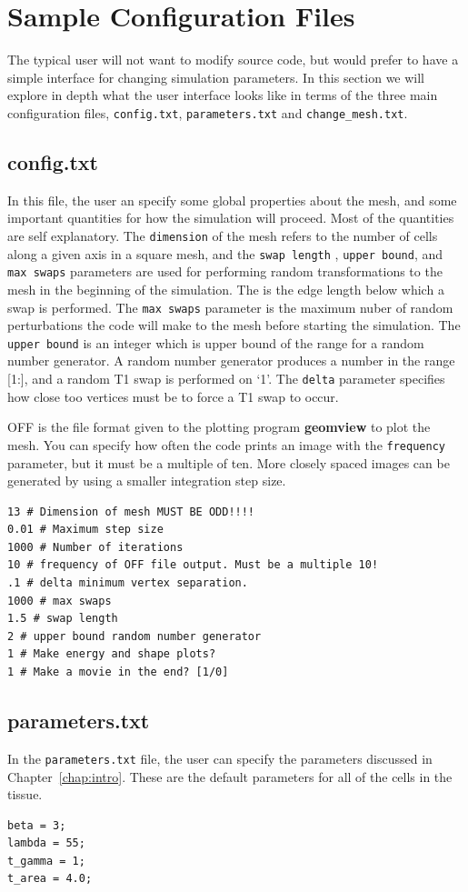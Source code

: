 \section{Sample Configuration Files}
The typical user will not want to modify source code, but would prefer to have a simple interface for changing simulation parameters. In this section we will explore in depth what the user interface looks like in terms of the three main configuration files, \texttt{config.txt}, \texttt{parameters.txt} and \texttt{change\_mesh.txt}.
\subsection{config.txt}
In this file, the user an specify some global properties about the mesh, and some important quantities for how the simulation will proceed. Most of the quantities are self explanatory. The \texttt{dimension} of the mesh refers to the number of cells along a given axis in a square mesh, and the \texttt{swap length} , \texttt{upper bound}, and \texttt{max swaps} parameters are used for performing random transformations to the mesh in the beginning of the simulation. The  is the edge length below which a swap is performed. The \texttt{max swaps} parameter is the maximum nuber of random perturbations the code will make to the mesh before starting the simulation. The \texttt{upper bound} is an integer which is upper bound of the range for a random number generator. A random number generator produces a number in the range [1:], and a random T1 swap is performed on `1'. The \texttt{delta} parameter specifies how close too vertices must be to force a T1 swap to occur.

OFF is the file format given to the plotting program \textbf{geomview} to plot the mesh. You can specify how often the code prints an image with the \texttt{frequency} parameter, but it must be a multiple of ten. More closely spaced images can be generated by using a smaller integration step size.
\begin{lstlisting}
13 # Dimension of mesh MUST BE ODD!!!!
0.01 # Maximum step size
1000 # Number of iterations
10 # frequency of OFF file output. Must be a multiple 10!
.1 # delta minimum vertex separation.
1000 # max swaps
1.5 # swap length
2 # upper bound random number generator
1 # Make energy and shape plots?
1 # Make a movie in the end? [1/0]
\end{lstlisting}

\subsection{parameters.txt}
In the \texttt{parameters.txt} file, the user can specify the parameters discussed in Chapter~\ref{chap:intro}. These are the default parameters for all of the cells in the tissue. 
\begin{lstlisting}
beta = 3;
lambda = 55;
t_gamma = 1;
t_area = 4.0;
\end{lstlisting}

